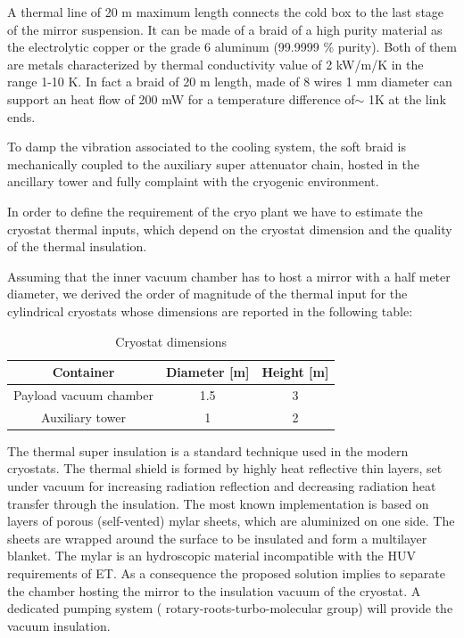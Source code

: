 A  thermal line of 20 m maximum length connects the cold box to the last stage of the mirror suspension. It can be made of a  braid  of a high purity material as the electrolytic copper or the grade 6 aluminum (99.9999 \% purity). Both of them  are metals characterized by  thermal conductivity value of 2 kW/m/K in the range 1-10 K. In fact  a braid of   20 m length, made of 8 wires 1 mm diameter can support an heat flow of 200 mW for a temperature  difference  of$\sim$ 1K at the link ends.

To damp the vibration associated  to the cooling system, the soft braid is mechanically coupled to the auxiliary super attenuator chain, hosted in the ancillary tower and   fully complaint with the cryogenic environment. 


In order to define the requirement of  the cryo plant  we have to estimate the cryostat thermal inputs, which depend on the cryostat dimension and the quality of the thermal insulation. 

\noindent
Assuming  that the inner vacuum chamber has to host a mirror with a half meter diameter, we derived the order of magnitude of the thermal input  for the cylindrical cryostats whose dimensions are reported  in the following table:
\begin{table}[htdp]
\caption{Cryostat dimensions}
\begin{center}
\begin{tabular}{|c|c|c|}
\hline
\hline
 Container & Diameter [m] & Height [m]\\
\hline
Payload vacuum chamber & 1.5 & 3  \\
Auxiliary tower  & 1 & 2 \\
\hline
\hline
\end{tabular}
\end{center}
\label{tab:cryostat_dimension}
\end{table}

 The thermal super insulation is a standard technique used in the modern cryostats.  The thermal  shield is formed by  highly heat reflective thin layers, set under vacuum  for increasing radiation reflection and decreasing radiation heat transfer through the insulation.  The  most known  implementation   is based on layers  of porous (self-vented) mylar  sheets, which are  aluminized on one side. The sheets are wrapped around the surface to be insulated and  form  a multilayer blanket. 
The mylar is an hydroscopic material incompatible with the HUV requirements of ET. As a consequence the proposed solution implies to  separate the chamber hosting the mirror to the insulation vacuum of the cryostat.   A dedicated pumping system ( rotary-roots-turbo-molecular group) will provide the vacuum insulation.  


